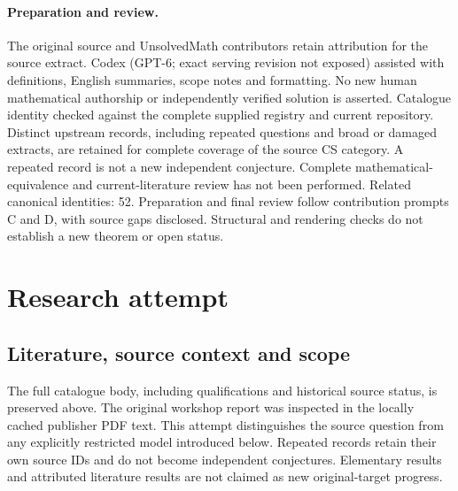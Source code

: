 \documentclass[11pt]{article}
\begin{document}
\paragraph{Preparation and review.}
The original source and UnsolvedMath contributors retain attribution for the source extract. Codex (GPT-6; exact serving revision not exposed) assisted with definitions, English summaries, scope notes and formatting. No new human mathematical authorship or independently verified solution is asserted. Catalogue identity checked against the complete supplied registry and current repository. Distinct upstream records, including repeated questions and broad or damaged extracts, are retained for complete coverage of the source CS category. A repeated record is not a new independent conjecture. Complete mathematical-equivalence and current-literature review has not been performed. Related canonical identities: 52. Preparation and final review follow contribution prompts C and D, with source gaps disclosed. Structural and rendering checks do not establish a new theorem or open status.
\label{end:statement}

\section{Research attempt}
\subsection{Literature, source context and scope}
The full catalogue body, including qualifications and historical source status, is preserved above. The original workshop report was inspected in the locally cached publisher PDF text. This attempt distinguishes the source question from any explicitly restricted model introduced below. Repeated records retain their own source IDs and do not become independent conjectures. Elementary results and attributed literature results are not claimed as new original-target progress.
\end{document}
